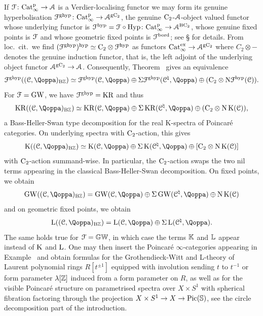 \begin{example}
\label{example:shaneson-splitting-Ghyp}%
If $\mathcal{F}\colon \mathrm{Cat}^{\mathrm p}_\infty \to \mathcal{A}$ is a Verdier-localising functor we may form its genuine hyperbolisation $\mathcal{F}^{\mathrm{g}\mathrm{hyp}}\colon \mathrm{Cat}^{\mathrm p}_\infty \to \mathcal{A}^{\mathrm{g}\mathrm{C_2}}$, the genuine $\mathrm{C_2}$-$\mathcal{A}$-object valued functor whose underlying functor is $\mathcal{F}^{\mathrm{hyp}} = \mathcal{F} \circ \operatorname{Hyp} \colon \mathrm{Cat}^{\mathrm p}_\infty \to \mathcal{A}^{\mathrm{B}\mathrm{C_2}}$, whose genuine fixed points is $\mathcal{F}$ and whose geometric fixed points is $\mathcal{F}^{\mathrm{bord}}$; see \S{} for details. From loc.\ cit.\ we find $(\mathcal{F}^{\mathrm{g}\mathrm{hyp}})^{\mathrm{hyp}} \simeq \mathrm{C_2} \otimes \mathcal{F}^{\mathrm{hyp}}$ as functors $\mathrm{Cat}_\infty^{\mathrm{ex}} \to \mathcal{A}^{{\mathrm{g}\mathrm{C_2}}}$ where $C_2 \otimes - $ denotes the genuine induction functor, that is, the left adjoint of the underlying object functor $\mathcal{A}^{{\mathrm{g}\mathrm{C_2}}} \to \mathcal{A}$. Consequently,
Theorem~ gives an equivalence
\[
\F^{\ghyp}((\C,\QF)_{\B\ZZ}) \simeq \F^{\ghyp}(\C,\QF) \oplus \Sigma \F^{\ghyp}(\C^\natural,\QF) \oplus (\Ct \otimes \mathrm \N\F^\hyp(\C)).
\]
For $\mathcal{F}= \operatorname{GW}$, we have $\mathcal{F}^{{\mathrm{g}\mathrm{hyp}}}= \operatorname{KR}$ and thus
\[
\KR((\C,\QF)_{\B\ZZ}) \simeq \KR(\C,\QF) \oplus \Sigma \KR(\C^{\natural},\QF) \oplus (\Ct \otimes \N\K(\C)),
\]
a Bass-Heller-Swan type decomposition for the real K-spectra of Poincaré categories. On underlying spectra with $\mathrm{C_2}$-action, this gives
\[
\K((\C,\QF)_{\B\ZZ}) \simeq \K(\C,\QF) \oplus \Sig \K(\C^\natural,\QF) \oplus [\Ct \otimes \N\K(\C)]
\]
with $\mathrm{C_2}$-action summand-wise. In particular, the $\mathrm{C_2}$-action swaps the two nil terms appearing in the classical Bass-Heller-Swan decomposition. On fixed points, we obtain
\[
\GW((\C,\QF)_{\B\ZZ}) = \GW(\C,\QF) \oplus \Sigma \GW(\C^{\natural},\QF) \oplus \N\K(\C)
\]
and on geometric fixed points, we obtain
\[
\L((\C,\QF)_{\B\ZZ}) = \L(\C,\QF) \oplus \Sigma \L(\C^{\natural},\QF).
\]
The same holds true for $\mathcal{F}=\mathbb{GW}$, in which case the terms $\mathbb K$ and $\mathbb{L}$ appear instead of $\operatorname K$ and $\operatorname L$.
One may then insert the Poincar\'e $\infty$-categories appearing in Example~ and obtain formulas for the Grothendieck-Witt and L-theory of Laurent polynomial rings $R[t^{\pm 1}]$ equipped with involution sending $t$ to $t^{-1}$ or form parameter $\lambda[\mathbb{Z}]$ induced from a form parameter on $R$, as well as for the visible Poincar\'e structure on parametrised spectra over $X \times S^1$ with spherical fibration factoring through the projection $X \times S^1 \to X \to \operatorname{Pic}(\mathbb{S})$, see the circle decomposition part of the introduction.
\end{example}





